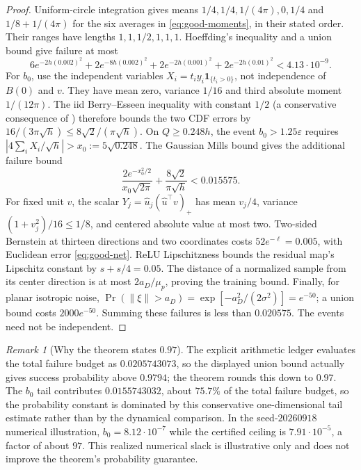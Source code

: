 \documentclass[10pt]{article}
\theoremstyle{remark}\newtheorem{remark}[theorem]{Remark}
\begin{document}
\begin{proof}
Uniform-circle integration gives means $1/4,1/4,1/(4\pi),0,1/4$
and $1/8+1/(4\pi)$ for the six averages in
\eqref{eq:good-moments}, in their stated order. Their ranges have lengths
$1,1,1/2,1,1,1$. Hoeffding's inequality and a union bound give failure at most
\[
 6e^{-2h(0.002)^2}+2e^{-8h(0.002)^2}
 +2e^{-2h(0.001)^2}+2e^{-2h(0.01)^2}<4.13\cdot10^{-9}.
\]
For $b_0$, use the independent variables
$X_i=t_i y_i\mathbf1_{\{t_i>0\}}$, not independence of $B(0)$ and $v$.
They have mean zero, variance $1/16$ and third absolute moment $1/(12\pi)$.
The iid Berry--Esseen inequality with constant $1/2$ (a conservative
consequence of \cite{shevtsova2011}) therefore bounds the two
CDF errors by $16/(3\pi\sqrt h)\le8\sqrt2/(\pi\sqrt h)$.
On $Q\ge0.248h$, the event $b_0>1.25\varepsilon$ requires
$|4\sum_iX_i/\sqrt h|>x_0:=5\sqrt{0.248}$.
The Gaussian Mills bound gives the additional failure bound
\[
 \frac{2e^{-x_0^2/2}}{x_0\sqrt{2\pi}}+
 \frac{8\sqrt2}{\pi\sqrt h}<0.015575.
\]
For fixed unit $v$, the scalar
$Y_j=\widehat u_j(\widehat u^\top v)_+$ has mean $v_j/4$,
variance $(1+v_j^2)/16\le1/8$, and centered absolute value at most two.
Two-sided Bernstein at thirteen directions and two coordinates costs
$52e^{-\ell}=0.005$, with Euclidean error \eqref{eq:good-net}.
ReLU Lipschitzness bounds the residual map's Lipschitz constant by
$s+s/4=0.05$. The distance of a normalized sample from its center
direction is at most $2a_D/\mu_p$, proving the training bound.
Finally, for planar isotropic noise,
$\Pr(\|\xi\|>a_D)=\exp[-a_D^2/(2\sigma^2)]=e^{-50}$;
a union bound costs $2000e^{-50}$. Summing these failures is less than
$0.020575$. The events need not be independent.
\end{proof}

\begin{remark}[Why the theorem states $0.97$]
The explicit arithmetic ledger evaluates the total failure budget as
$0.0205743073$, so the displayed union bound actually gives success
probability above $0.9794$; the theorem rounds this down to $0.97$.
The $b_0$ tail contributes $0.0155743032$, about $75.7\%$ of the total
failure budget, so the probability constant is dominated by this
conservative one-dimensional tail estimate rather than by the dynamical
comparison. In the seed-$20260918$ numerical illustration,
$b_0=8.12\cdot10^{-7}$ while the certified ceiling is
$7.91\cdot10^{-5}$, a factor of about $97$. This realized numerical slack
is illustrative only and does not improve the theorem's probability
guarantee.
\end{remark}
\end{document}

